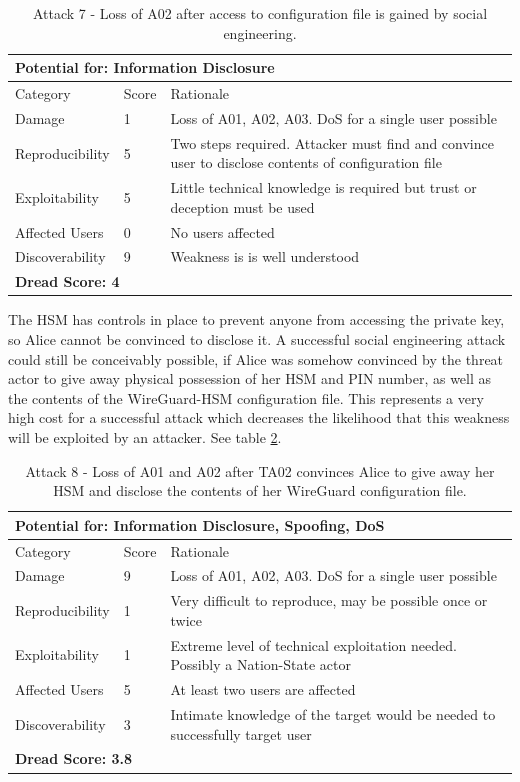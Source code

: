 \documentclass [11pt, proquest] {uwthesis}[2020/02/24]
\begin{document}
\begin{table}[H]
\begin{tabular}{|m{3cm}|m{.9cm}|p{27em} |}
\multicolumn{3}{l}{Potential for: Information Disclosure}                   \\
\hline
Category & Score & Rationale \\
\hline
Damage          & 1     & Loss of A01, A02, A03. DoS for a single user possible            \\
\hline
Reproducibility & 5     & Two steps required. Attacker must find and convince user to disclose contents of configuration file    \\
\hline
Exploitability & 5      & Little technical knowledge is required but trust or deception must be used   \\
\hline
Affected Users  & 0     &  No users affected                     \\
\hline
Discoverability & 9     & Weakness is is well understood  \\
\hline
\multicolumn{3}{l}{\textbf{Dread Score: 4}} 
\end{tabular}
\caption{Attack 7 - Loss of A02 after access to configuration file is gained by social engineering.}
\label{hsm:attack7}
\end{table}

The HSM has controls in place to prevent anyone from accessing the private key, so Alice cannot be convinced to disclose it.
A successful social engineering attack could still be conceivably possible, if Alice was somehow convinced by the threat actor to give away physical possession of her HSM and PIN number, as well as the contents of the WireGuard-HSM configuration file. This represents a very high cost for a successful attack which decreases the likelihood that this weakness will be exploited by an attacker. 
See table \ref{hsm:attack8}.


\begin{table}[H]
\begin{tabular}{|m{3cm}|m{.9cm}|p{27em} |}
\multicolumn{3}{l}{Potential for: Information Disclosure, Spoofing, DoS}                   \\
\hline
Category & Score & Rationale \\
\hline
Damage          & 9     & Loss of A01, A02, A03. DoS for a single user possible            \\
\hline
Reproducibility & 1     & Very difficult to reproduce, may be possible once or twice  \\
\hline
Exploitability & 1      & Extreme level of technical exploitation needed. Possibly a Nation-State actor  \\
\hline
Affected Users  & 5     & At least two users are affected                      \\
\hline
Discoverability & 3     & Intimate knowledge of the target would be needed to successfully target user \\
\hline
\multicolumn{3}{l}{\textbf{Dread Score: 3.8}} 
\end{tabular}
\caption{Attack 8 - Loss of A01 and A02 after TA02 convinces Alice to give away her HSM and disclose the contents of her WireGuard configuration file.}
\label{hsm:attack8}
\end{table}
\end{document}
